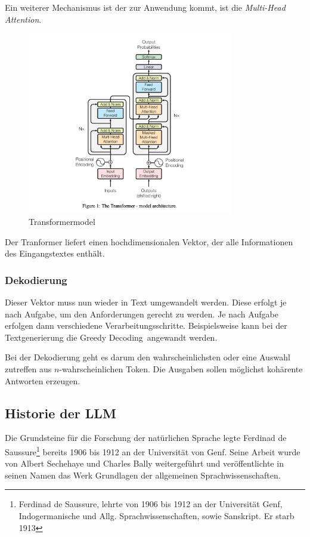Ein weiterer Mechanismus ist der zur Anwendung kommt, ist die \textit{Multi-Head Attention}.

\begin{center}
	\begin{figure}[!ht]
		\includegraphics[width=0.8\textwidth]{content/chapter_basics/images/llm_transformer_model.png}
		\centering
		\caption{Transformermodel}
		\label{img:llm_transformer_model}
	\end{figure}
\end{center}

Der Tranformer liefert einen hochdimensionalen Vektor, der alle Informationen des Eingangstextes enthält.


\subsubsection{Dekodierung}
Dieser Vektor muss nun wieder in Text umgewandelt werden. Diese erfolgt je nach Aufgabe, um den Anforderungen gerecht zu werden. Je nach Aufgabe erfolgen dann verschiedene Verarbeitungsschritte. Beispielsweise kann bei der Textgenerierung die \glqq Greedy Decoding\grqq \ angewandt werden.\vspace{0.2cm}

Bei der Dekodierung geht es darum den wahrscheinlichsten oder eine Auswahl zutreffen aus $n$-wahrscheinlichen Token. Die Ausgaben sollen möglichst kohärente Antworten erzeugen.


\subsection{Historie der LLM}
Die Grundsteine für die Forschung der natürlichen Sprache legte Ferdinad de Saussure\footnote{Ferdinad de Saussure, lehrte von 1906 bis 1912 an der Universität Genf, Indogermanische und Allg. Sprachwissenschaften, sowie Sanskript. Er starb 1913} bereits 1906 bis 1912 an der Universität von Genf. Seine Arbeit wurde von Albert Sechehaye und Charles Bally weitergeführt und veröffentlichte in seinen Namen das Werk \glqq Grundlagen der allgemeinen Sprachwissenschaften\grqq .

